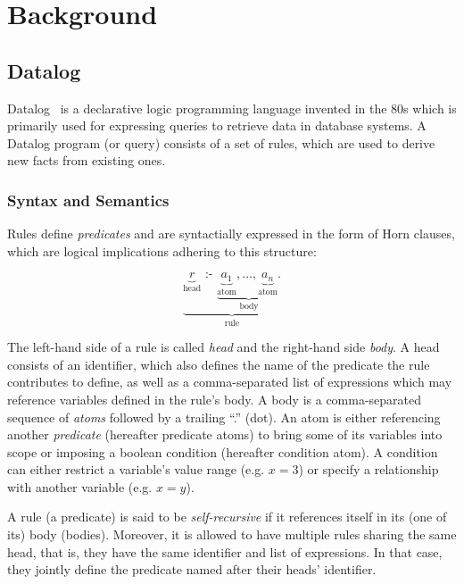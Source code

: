 
\chapter{Background}\label{ch:background}

\section{Datalog}\label{sec:datalog}

Datalog~\cite{green2013datalog} is a declarative logic programming language
invented in the 80s which is primarily used for expressing queries to retrieve
data in database systems.
A Datalog program (or query) consists of a set of rules, which are used to
derive new facts from existing ones.

\subsection{Syntax and Semantics}\label{sec:datalog-syntax-semantics}

Rules define \emph{predicates} and are syntactially expressed in the form of
Horn clauses, which are logical implications adhering to this structure:

\begin{equation}
	\underbrace{
	\underbrace{r}_{\text{head}}
	\text{ :- }
	\underbrace{
	\underbrace{a_1}_{\text{atom}},
	\ldots,
	\underbrace{a_n}_{\text{atom}}.
	}_{\text{body}}
	}_{\text{rule}}
\end{equation}

The left-hand side of a rule is called \emph{head} and the right-hand side \emph{body}.
A head consists of an identifier, which also defines the name of the predicate
the rule contributes to define, as well as a comma-separated list of expressions
which may reference variables defined in the rule's body.
A body is a comma-separated sequence of \emph{atoms} followed by a trailing ``.'' (dot).
An atom is either referencing another \emph{predicate} (hereafter predicate atoms)
to bring some of its variables into scope or imposing a boolean condition
(hereafter condition atom).
A condition can either restrict a variable's value range (e.g. \(x = 3\))
or specify a relationship with another variable (e.g. \(x = y\)).

A rule (a predicate) is said to be \emph{self-recursive}
if it references itself in its (one of its) body (bodies).
Moreover, it is allowed to have multiple rules sharing the same head, that is,
they have the same identifier and list of expressions.
In that case, they jointly define the predicate named after their heads' identifier.

